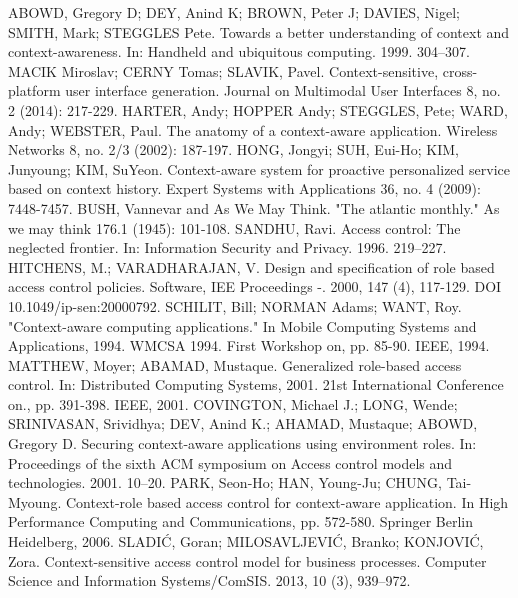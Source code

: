 \documentclass{poster15}
\begin{document}
\begin{thebibliography}{9}
ABOWD, Gregory D; DEY, Anind K; BROWN, Peter J; DAVIES, Nigel; SMITH, Mark; STEGGLES Pete. Towards a better understanding of context and context-awareness. In: Handheld and ubiquitous computing. 1999. 304–307.
MACIK Miroslav; CERNY Tomas; SLAVIK, Pavel. Context-sensitive, cross-platform user interface generation. Journal on Multimodal User Interfaces 8, no. 2 (2014): 217-229.
HARTER, Andy; HOPPER Andy; STEGGLES, Pete; WARD, Andy; WEBSTER, Paul. The anatomy of a context-aware application. Wireless Networks 8, no. 2/3 (2002): 187-197.
HONG, Jongyi; SUH, Eui-Ho; KIM, Junyoung; KIM, SuYeon. Context-aware system for proactive personalized service based on context history. Expert Systems with Applications 36, no. 4 (2009): 7448-7457.
BUSH, Vannevar and As We May Think. "The atlantic monthly." As we may think 176.1 (1945): 101-108.
SANDHU, Ravi. Access control: The neglected frontier. In: Information Security and Privacy. 1996. 219–227.
HITCHENS, M.; VARADHARAJAN, V. Design and specification of role based access control policies. Software, IEE Proceedings -. 2000, 147 (4), 117-129. DOI 10.1049/ip-sen:20000792.
SCHILIT, Bill; NORMAN Adams; WANT, Roy. "Context-aware computing applications." In Mobile Computing Systems and Applications, 1994. WMCSA 1994. First Workshop on, pp. 85-90. IEEE, 1994.
MATTHEW, Moyer; ABAMAD, Mustaque. Generalized role-based access control. In: Distributed Computing Systems, 2001. 21st International Conference on., pp. 391-398. IEEE, 2001.
COVINGTON, Michael J.; LONG, Wende; SRINIVASAN, Srividhya; DEV, Anind K.; AHAMAD, Mustaque; ABOWD, Gregory D. Securing context-aware applications using environment roles. In: Proceedings of the sixth ACM symposium on Access control models and technologies. 2001. 10–20.
PARK, Seon-Ho; HAN, Young-Ju; CHUNG, Tai-Myoung. Context-role based access control for context-aware application. In High Performance Computing and Communications, pp. 572-580. Springer Berlin Heidelberg, 2006.
SLADI\'C, Goran; MILOSAVLJEVI\'C, Branko; KONJOVI\'C, Zora. Context-sensitive access control model for business processes. Computer Science and Information Systems/ComSIS. 2013, 10 (3), 939–972.

\end{thebibliography}
\end{document}
